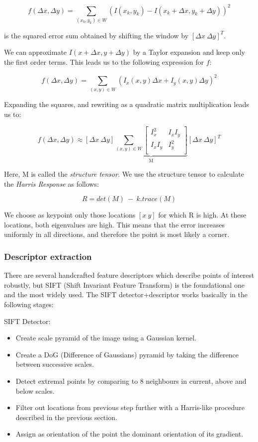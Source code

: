 \[f(\Delta x, \Delta y) = \sum_{(x_k, y_k) \in W}^{}(I(x_k, y_k) - I(x_k + \Delta x, y_k + \Delta y))^2\]

is the squared error sum obtained by shifting the window by $[\Delta x \ \Delta y]^T$.

We can approximate $I(x + \Delta x, y + \Delta y)$ by a Taylor expansion and keep only the first order terms. This leads us to the following expression for $f$:

\[f(\Delta x, \Delta y) = \sum_{(x, y) \in W}(I_x(x, y)\Delta x + I_y(x, y) \Delta y)^2\]

Expanding the squares, and rewriting as a quadratic matrix multiplication leads us to:

\[f(\Delta x, \Delta y) \approx [\Delta x \ \Delta y]\underbrace{\sum_{(x, y) \in W}\begin{bmatrix}
I_x^2 & I_xI_y\\
I_xI_y & I_y^2\\
\end{bmatrix}}_{\text{M}}[\Delta x \ \Delta y]^T\]

Here, M is called the \emph{structure tensor}. We use the structure tensor to calculate the \emph{Harris Response} as follows:

\[R = det(M)\ -\ k.trace(M)\]

We choose as keypoint only those locations $[x\ y]$ for which R is high. At these locations, both eigenvalues are high. This means  that the error increases uniformly in all directions, and therefore the point is most likely a corner. 

\subsubsection{Descriptor extraction}
There are several handcrafted feature descriptors which describe points of interest robustly, but SIFT (Shift Invariant Feature Transform) is the foundational one and the most widely used. The SIFT detector+descriptor works basically in the following stages:

SIFT Detector:
\begin{itemize}
\item Create scale pyramid of the image using a Gaussian kernel.
\item Create a DoG (Difference of Gaussians) pyramid by taking the difference between successive scales.
\item Detect extremal points by comparing to 8 neighbours in current, above and below scales.  
\item Filter out locations from previous step further with a Harris-like procedure described in the previous section.
\item Assign as orientation of the point the dominant orientation of its gradient.
\end{itemize}

